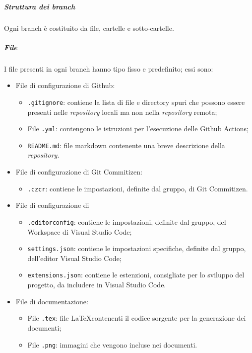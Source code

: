 \documentclass[../norme-di-progetto.tex]{subfiles}
\begin{document}
\subparagraph{Struttura dei branch}
Ogni branch è costituito da file, cartelle e sotto-cartelle.
\subparagraph*{File}
I file presenti in ogni branch hanno tipo fisso e predefinito; essi sono:
\begin{itemize}
  \item File di configurazione di Github:
  \begin{itemize}
    \item \texttt{.gitignore}: contiene la lista di file e directory spuri che possono essere presenti nelle \textit{repository} locali ma non nella \textit{repository} remota;
    \item File \texttt{.yml}: contengono le istruzioni per l'esecuzione delle Github Actions;
    \item \texttt{README.md}: file markdown contenente una breve descrizione della \textit{repository}.
  \end{itemize}
  \item File di configurazione di Git Commitizen:
  \begin{itemize}
    \item \texttt{.czcr}: contiene le impostazioni, definite dal gruppo, di Git Commitizen.
  \end{itemize}
  \item File di configurazione di 
  \begin{itemize}
    \item \texttt{.editorconfig}: contiene le impostazioni, definite dal gruppo, del Workspace di Visual Studio Code;
    \item \texttt{settings.json}: contiene le impostazioni specifiche, definite dal gruppo, dell'editor Visual Studio Code;
    \item \texttt{extensions.json}: contiene le estenzioni, consigliate per lo sviluppo del progetto, da includere in Visual Studio Code.
  \end{itemize}
  \item File di documentazione:
  \begin{itemize}
    \item File \texttt{.tex}: file \LaTeX contenenti il codice sorgente per la generazione dei documenti;
    \item File \texttt{.png}: immagini che vengono incluse nei documenti.
  \end{itemize}
\end{itemize}
\end{document}

